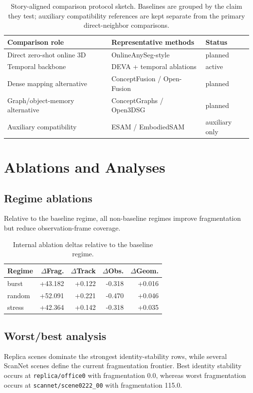 \documentclass[11pt]{article}
\begin{document}
\begin{table}[t]
\centering
\small
\begin{tabular}{lll}
\toprule
Comparison role & Representative methods & Status\\
\midrule
Direct zero-shot online 3D & OnlineAnySeg-style & planned\\
Temporal backbone & DEVA + temporal ablations & active\\
Dense mapping alternative & ConceptFusion / Open-Fusion & planned\\
Graph/object-memory alternative & ConceptGraphs / Open3DSG & planned\\
Auxiliary compatibility & ESAM / EmbodiedSAM & auxiliary only\\
\bottomrule
\end{tabular}
\caption{Story-aligned comparison protocol sketch. Baselines are grouped by the claim they test; auxiliary compatibility references are kept separate from the primary direct-neighbor comparisons.}
\end{table}

\section{Ablations and Analyses}
\subsection{Regime ablations}
Relative to the baseline regime, all non-baseline regimes improve fragmentation but reduce observation-frame coverage.

\begin{table}[t]
\centering
\small
\begin{tabular}{lrrrr}
\toprule
Regime & $\Delta$Frag. & $\Delta$Track & $\Delta$Obs. & $\Delta$Geom.\\
\midrule
burst  & +43.182 & +0.122 & -0.318 & +0.016\\
random & +52.091 & +0.221 & -0.470 & +0.046\\
stress & +42.364 & +0.142 & -0.318 & +0.035\\
\bottomrule
\end{tabular}
\caption{Internal ablation deltas relative to the baseline regime.}
\end{table}

\subsection{Worst/best analysis}
Replica scenes dominate the strongest identity-stability rows, while several ScanNet scenes define the current fragmentation frontier. Best identity stability occurs at \texttt{replica/office0} with fragmentation 0.0, whereas worst fragmentation occurs at \texttt{scannet/scene0222\_00} with fragmentation 115.0.
\end{document}

